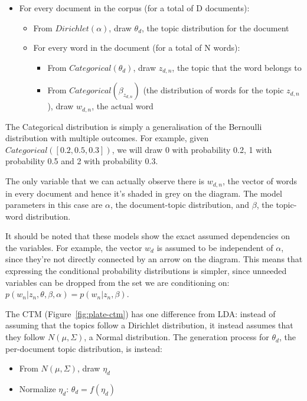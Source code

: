 \documentclass[12pt,a4paper,twoside,openright]{report}
\begin{document}
\begin{itemize}[noitemsep]
\item For every document in the corpus (for a total of D documents):
\begin{itemize}[noitemsep]
\item From $\mathit{Dirichlet}(\alpha)$, draw $\theta_d$, the topic distribution for the document
\item For every word in the document (for a total of N words):
\begin{itemize}[noitemsep]
\item From $\mathit{Categorical}(\theta_d)$, draw $z_{d, n}$, the topic that the word belongs to
\item From $\mathit{Categorical}(\beta_{z_{d, n}})$ (the distribution of words for the topic $z_{d, n}$), draw $w_{d, n}$, the actual word
\end{itemize}
\end{itemize}
\end{itemize}

The Categorical distribution is simply a generalisation of the Bernoulli distribution with multiple outcomes. For example, given $\mathit{Categorical}([0.2, 0.5, 0.3])$, we will draw 0 with probability 0.2, 1 with probability 0.5 and 2 with probability 0.3.

The only variable that we can actually observe there is $w_{d, n}$, the vector of words in every document and hence it's shaded in grey on the diagram. The model parameters in this case are $\alpha$, the document-topic distribution, and $\beta$, the topic-word distribution.

It should be noted that these models show the exact assumed dependencies on the variables. For example, the vector $w_d$ is assumed to be independent of $\alpha$, since they're not directly connected by an arrow on the diagram. This means that expressing the conditional probability distributions is simpler, since unneeded variables can be dropped from the set we are conditioning on: $p(w_n | z_n, \theta, \beta, \alpha) = p(w_n | z_n, \beta)$.

The CTM (Figure~\ref{fig:plate-ctm}) has one difference from LDA: instead of assuming that the topics follow a Dirichlet distribution, it instead assumes that they follow $N(\mu, \Sigma)$, a Normal distribution. The generation process for $\theta_d$, the per-document topic distribution, is instead:

\begin{itemize}[noitemsep]
\item From $N(\mu, \Sigma)$, draw $\eta_d$
\item Normalize $\eta_d$: $\theta_d = f(\eta_d) $
\end{itemize}
\end{document}
